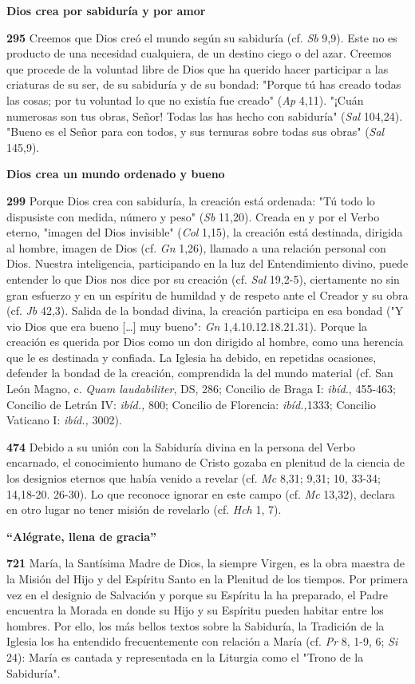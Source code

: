 \documentclass[]{article}
\begin{document}
\textbf{Dios crea por sabiduría y por amor}

\textbf{295} Creemos que Dios creó el mundo según su sabiduría (cf.
\emph{Sb} 9,9). Este no es producto de una necesidad cualquiera, de un
destino ciego o del azar. Creemos que procede de la voluntad libre de
Dios que ha querido hacer participar a las criaturas de su ser, de su
sabiduría y de su bondad: "Porque tú has creado todas las cosas; por tu
voluntad lo que no existía fue creado" (\emph{Ap} 4,11). "¡Cuán
numerosas son tus obras, Señor! Todas las has hecho con sabiduría"
(\emph{Sal} 104,24). "Bueno es el Señor para con todos, y sus ternuras
sobre todas sus obras" (\emph{Sal} 145,9).

\textbf{Dios crea un mundo ordenado y bueno}

\textbf{299} Porque Dios crea con sabiduría, la creación está ordenada:
"Tú todo lo dispusiste con medida, número y peso" (\emph{Sb} 11,20).
Creada en y por el Verbo eterno, "imagen del Dios invisible" (\emph{Col}
1,15), la creación está destinada, dirigida al hombre, imagen de Dios
(cf. \emph{Gn} 1,26), llamado a una relación personal con Dios. Nuestra
inteligencia, participando en la luz del Entendimiento divino, puede
entender lo que Dios nos dice por su creación (cf. \emph{Sal} 19,2-5),
ciertamente no sin gran esfuerzo y en un espíritu de humildad y de
respeto ante el Creador y su obra (cf. \emph{Jb} 42,3). Salida de la
bondad divina, la creación participa en esa bondad ("Y vio Dios que era
bueno [\ldots{}] muy bueno": \emph{Gn} 1,4.10.12.18.21.31). Porque la
creación es querida por Dios como un don dirigido al hombre, como una
herencia que le es destinada y confiada. La Iglesia ha debido, en
repetidas ocasiones, defender la bondad de la creación, comprendida la
del mundo material (cf. San León Magno, c. \emph{Quam laudabiliter}, DS,
286; Concilio de Braga I: \emph{ibíd.}, 455-463; Concilio de Letrán IV:
\emph{ibíd.,} 800; Concilio de Florencia: \emph{ibíd.,}1333; Concilio
Vaticano I: \emph{ibíd.,} 3002).

\textbf{474} Debido a su unión con la Sabiduría divina en la persona del
Verbo encarnado, el conocimiento humano de Cristo gozaba en plenitud de
la ciencia de los designios eternos que había venido a revelar (cf.
\emph{Mc} 8,31; 9,31; 10, 33-34; 14,18-20. 26-30). Lo que reconoce
ignorar en este campo (cf. \emph{Mc} 13,32), declara en otro lugar no
tener misión de revelarlo (cf. \emph{Hch} 1, 7).

\textbf{``Alégrate, llena de gracia''}

\textbf{721} María, la Santísima Madre de Dios, la siempre Virgen, es la
obra maestra de la Misión del Hijo y del Espíritu Santo en la Plenitud
de los tiempos. Por primera vez en el designio de Salvación y porque su
Espíritu la ha preparado, el Padre encuentra la Morada en donde su Hijo
y su Espíritu pueden habitar entre los hombres. Por ello, los más bellos
textos sobre la Sabiduría, la Tradición de la Iglesia los ha entendido
frecuentemente con relación a María (cf. \emph{Pr} 8, 1-9, 6; \emph{Si}
24): María es cantada y representada en la Liturgia como el "Trono de la
Sabiduría".
\end{document}
